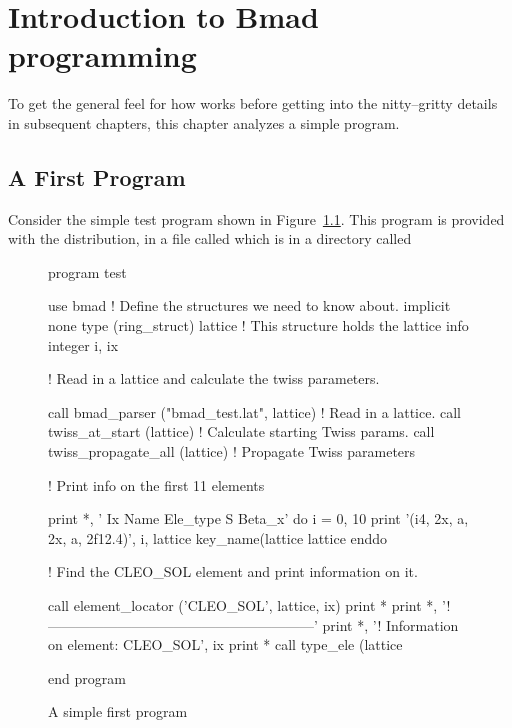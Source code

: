 \chapter{Introduction to Bmad programming}
\label{c:program_info}

To get the general feel for how \bmad works before
getting into the nitty--gritty details in subsequent chapters, this
chapter analyzes a simple program.

\section{A First Program}

Consider the simple test program shown in Figure~\ref{f:program}.
This program is provided with the \bmad distribution, in a file called
 which is in a directory called 

\begin{figure}
\begin{listing}{1}
program test

  use bmad                 ! Define the structures we need to know about.
  implicit none
  type (ring_struct) lattice  ! This structure holds the lattice info
  integer i, ix

! Read in a lattice and calculate the twiss parameters.

  call bmad_parser ("bmad_test.lat", lattice)    ! Read in a lattice.
  call twiss_at_start (lattice)           ! Calculate starting Twiss params.
  call twiss_propagate_all (lattice)      ! Propagate Twiss parameters

! Print info on the first 11 elements

  print *, ' Ix  Name              Ele_type                   S      Beta_x'
  do i = 0, 10
    print '(i4, 2x, a, 2x, a, 2f12.4)', i, lattice%
                    key_name(lattice%
                    lattice%
  enddo

! Find the CLEO_SOL element and print information on it.

  call element_locator ('CLEO_SOL', lattice, ix)
  print *
  print *, '!---------------------------------------------------------'
  print *, '! Information on element: CLEO_SOL', ix
  print *
  call type_ele (lattice%

end program
\end{listing}
\caption{A simple first program}
\label{f:program}
\end{figure}

